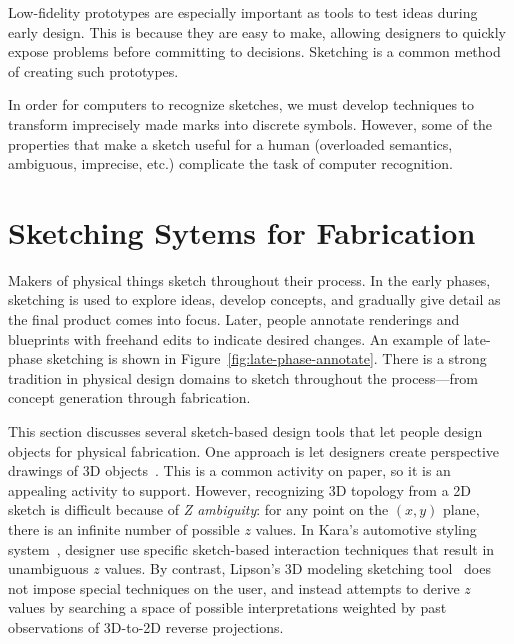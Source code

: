 Low-fidelity prototypes are especially important as tools to test
ideas during early design. This is because they are easy to make,
allowing designers to quickly expose problems before committing to
decisions. Sketching is a common method of creating such prototypes.

In order for computers to recognize sketches, we must develop
techniques to transform imprecisely made marks into discrete
symbols. However, some of the properties that make a sketch useful for
a human (overloaded semantics, ambiguous, imprecise, etc.) complicate
the task of computer recognition.


\section{Sketching Sytems for Fabrication}

Makers of physical things sketch throughout their process. In the
early phases, sketching is used to explore ideas, develop concepts,
and gradually give detail as the final product comes into
focus. Later, people annotate renderings and blueprints with freehand
edits to indicate desired changes. An example of late-phase sketching
is shown in Figure~\ref{fig:late-phase-annotate}. There is a strong
tradition in physical design domains to sketch throughout the
process---from concept generation through fabrication.



This section discusses several sketch-based design tools that let
people design objects for physical fabrication. One approach is let
designers create perspective drawings of 3D
objects~\cite{kara-3d-styling,lipson-correlation}. This is a common
activity on paper, so it is an appealing activity to support. However,
recognizing 3D topology from a 2D sketch is difficult because of
\textit{Z ambiguity}: for any point on the $(x, y)$ plane, there is an
infinite number of possible $z$ values. In Kara's automotive styling
system~\cite{kara-3d-styling}, designer use specific sketch-based
interaction techniques that result in unambiguous $z$ values. By
contrast, Lipson's 3D modeling sketching
tool~\cite{lipson-correlation} does not impose special techniques on
the user, and instead attempts to derive $z$ values by searching a
space of possible interpretations weighted by past observations of
3D-to-2D reverse projections.

